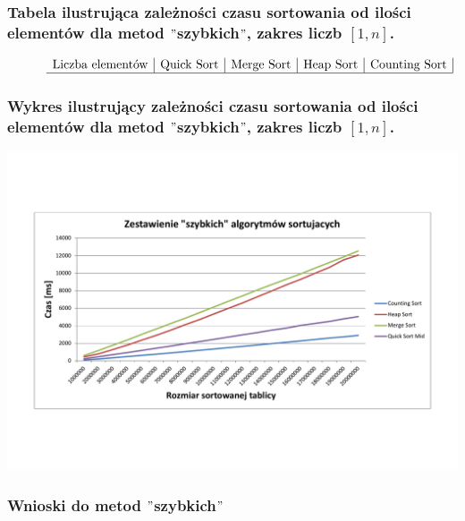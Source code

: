 \documentclass[polish,polish,a4paper]{article}
\begin{document}
\begin{spacing}{1.5}
	\subsubsection*{Tabela ilustrująca zależności czasu sortowania od ilości elementów dla metod $"$szybkich$"$, zakres liczb $ [1,n] $.}

\begin{figure}[H]
	\begin{equation*}
	\begin{array}{l|c|c|c|c|}
	
	$Liczba elementów$&$Quick Sort$&$Merge Sort$&$Heap Sort$&$Counting Sort$\\
	\hline
	\end{array}
	\end{equation*}
\end{figure}

\subsubsection*{Wykres ilustrujący zależności czasu sortowania od ilości elementów dla metod $"$szybkich$"$, zakres liczb $ [1,n] $.}

	\begin{minipage}[H]{\textwidth}
	\begin{center}
		\includegraphics[scale=0.6]{zad2szybkie.pdf}
		\label{fig:zad2szybkie}
	\end{center}
\end{minipage}

\subsubsection{Wnioski do metod $"$szybkich$"$}



\end{spacing}
\end{document}
